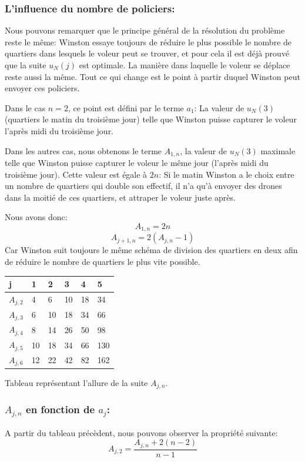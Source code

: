 \subsubsection{L'influence du nombre de policiers:}
Nous pouvons remarquer que le principe général de la résolution du problème reste le même: Winston essaye toujours de réduire le plus possible le nombre de quartiers dans lesquels le voleur peut se trouver, et pour cela il est déjà prouvé que la suite $u_N(j)$ est optimale. La manière dans laquelle le voleur se déplace reste aussi la même. Tout ce qui change est le point à partir duquel Winston peut envoyer ces policiers.

\medskip

Dans le cas $n=2$, ce point est défini par le terme $a_1$: La valeur de $u_N(3)$ (quartiers le matin du troisième jour) telle que Winston puisse capturer le voleur l'après midi du troisième jour.

\medskip

Dans les autres cas, nous obtenons le terme $A_{1,n}$, la valeur de $u_N(3)$ maximale telle que Winston puisse capturer le voleur le même jour (l'après midi du troisième jour). Cette valeur est égale à $2n$: Si le matin Winston a le choix entre un nombre de quartiers qui double son effectif, il n'a qu'à envoyer des drones dans la moitié de ces quartiers, et attraper le voleur juste après.

\medskip

Nous avons donc: $$A_{1,n}=2n$$
$$A_{j+1,n}=2(A_{j,n}-1)$$
Car Winston suit toujours le même schéma de division des quartiers en deux afin de réduire le nombre de quartiers le plus vite possible.

\begin{table}[h]
\begin{tabular}{|l|l|l|l|l|l|}
\hline
j         & 1  & 2  & 3  & 4  & 5   \\ \hline
$A_{j,2}$ & 4  & 6  & 10 & 18 & 34  \\ \hline
$A_{j,3}$ & 6  & 10 & 18 & 34 & 66  \\ \hline
$A_{j,4}$ & 8  & 14 & 26 & 50 & 98  \\ \hline
$A_{j,5}$ & 10 & 18 & 34 & 66 & 130 \\ \hline
$A_{j,6}$ & 12 & 22 & 42 & 82 & 162 \\ \hline
\end{tabular}
\end{table}

Tableau représentant l'allure de la suite $A_{j,n}$.
\subsubsection{$A_{j,n}$ en fonction de $a_j$:}
A partir du tableau précèdent, nous pouvons observer la propriété suivante: $$A_{j,2}=\dfrac{A_{j,n}+2(n-2)}{n-1}$$

